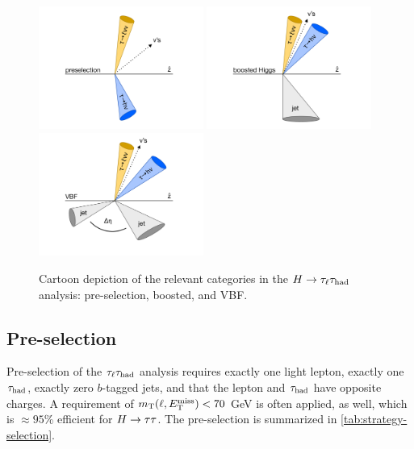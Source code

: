 \begin{figure}[tp]
  \centering
  \includegraphics[width=0.48\textwidth]{figures/category-cartoons/presel}
  \includegraphics[width=0.48\textwidth]{figures/category-cartoons/boost}
  \includegraphics[width=0.48\textwidth]{figures/category-cartoons/vbf}
  \caption{Cartoon depiction of the relevant categories in the $H\rightarrow\tau_\ell\tau_\text{had}$ analysis: pre-selection, boosted, and VBF.}
  \label{fig:strategy-category-cartoons}
\end{figure}

\subsection{Pre-selection}
\label{sec:strategy-preselection}

Pre-selection of the $\tau_\ell\tau_\text{had}$ analysis requires exactly one light lepton, exactly one $\tau_\text{had}$, exactly zero $b$-tagged jets, and that the lepton and $\tau_\text{had}$ have opposite charges. A requirement of $m_\text{T}(\ell, E_{\mathrm{T}}^{\mathrm{miss}}) < 70$ GeV is often applied, as well, which is $\approx\!95$\% efficient for $H\rightarrow\tau\tau$. The pre-selection is summarized in \cref{tab:strategy-selection}.

